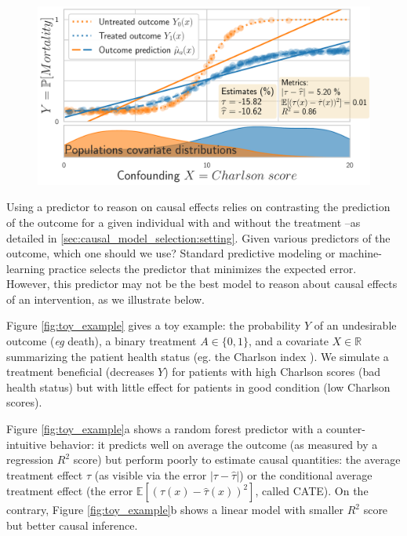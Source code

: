 \documentclass{report}
\begin{document}
\begin{figure}[t!]
\begin{minipage}{0.65\textwidth}
    \hfill%
    \includegraphics[width=1\linewidth]{img/chapter_5/toy_tlinear_model_small_R2_small_tau_risk.pdf}%
  \end{minipage}
\end{figure}


Using a predictor to reason on causal effects relies on contrasting the
prediction of the outcome for a given individual with and without the
treatment --as detailed in \autoref{sec:causal_model_selection:setting}.
%
Given various predictors of the outcome, which one should we use?
%
Standard predictive modeling or machine-learning practice selects the
predictor that minimizes the expected error.
However, this predictor may not be the best model to reason about
causal effects of an intervention, as we illustrate below.

Figure \ref{fig:toy_example} gives a toy example: the probability $Y$ of
an undesirable
outcome (\emph{eg} death), a binary treatment $A \in \{0, 1\}$, and a covariate
$X \in \mathbb R$ summarizing the patient health status (eg. the
Charlson index \citep{charlson_new_1987}). We simulate a
treatment beneficial (decreases $Y$) for patients with high Charlson scores (bad health
status) but with little effect for patients in good
condition (low Charlson scores).


Figure \ref{fig:toy_example}a shows a random forest predictor with a
counter-intuitive behavior: it predicts well on average the outcome (as measured
by a regression $R^2$ score) but perform poorly to estimate causal quantities:
the average treatment effect $\tau$ (as visible via the error $|\tau -
  \hat{\tau}|$) or the conditional average treatment effect (the error
$\mathbb{E}[(\tau(x) - \hat{\tau}(x))^2]$, called CATE).
%
On the contrary, Figure \ref{fig:toy_example}b shows a linear model with
smaller $R^2$ score but better causal inference.%
\end{document}
